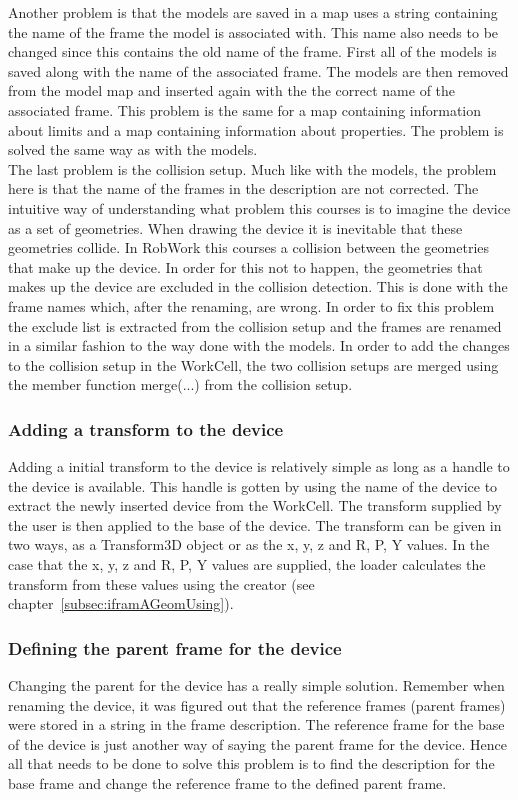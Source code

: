 Another problem is that the models are saved in a map uses a string containing the name of the frame the model is associated with. This name also needs to be changed since this contains the old name of the frame. First all of the models is saved along with the name of the associated frame. The models are then removed from the model map and inserted again with the the correct name of the associated frame. This problem is the same for a map containing information about limits and a map containing information about properties. The problem is solved the same way as with the models.\\

The last problem is the collision setup. Much like with the models, the problem here is that the name of the frames in the description are not corrected. The intuitive way of understanding what problem this courses is to imagine the device as a set of geometries. When drawing the device it is inevitable that these geometries collide. In RobWork this courses a collision between the geometries that make up the device. In order for this not to happen, the geometries that makes up the device are excluded in the collision detection. This is done with the frame names which, after the renaming, are wrong. In order to fix this problem the exclude list is extracted from the collision setup and the frames are renamed in a similar fashion to the way done with the models. In order to add the changes to the collision setup in the WorkCell, the two collision setups are merged using the member function merge(...) from the collision setup.

\subsubsection{Adding a transform to the device}
Adding a initial transform to the device is relatively simple as long as a handle to the device is available. This handle is gotten by using the name of the device to extract the newly inserted device from the WorkCell. The transform supplied by the user is then applied to the base of the device. The transform can be given in two ways, as a Transform3D object or as the x, y, z and R, P, Y values. In the case that the x, y, z and R, P, Y values are supplied, the loader calculates the transform from these values using the creator (see chapter~\ref{subsec:iframAGeomUsing}).

\subsubsection{Defining the parent frame for the device}
Changing the parent for the device has a really simple solution. Remember when renaming the device, it was figured out that the reference frames (parent frames) were stored in a string in the frame description. The reference frame for the base of the device is just another way of saying the parent frame for the device. Hence all that needs to be done to solve this problem is to find the description for the base frame and change the reference frame to the defined parent frame.


